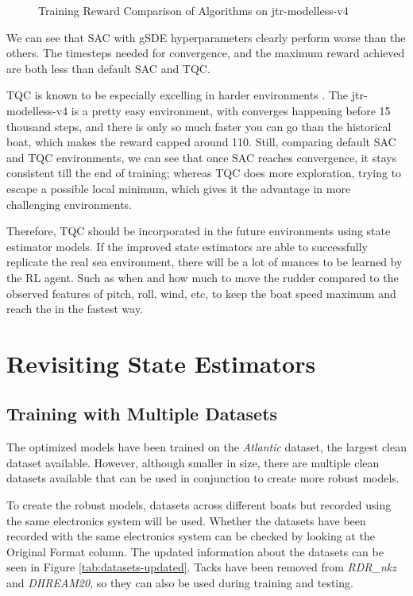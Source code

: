 \documentclass[12pt,twoside]{report}
\begin{document}
\begin{figure}[h]
\begin{subfigure}[b]{0.48\textwidth}
    \end{subfigure}
    \caption{Training Reward Comparison of Algorithms on jtr-modelless-v4}
    \label{fig:rl-comparison}
\end{figure}

We can see that SAC with gSDE hyperparameters clearly perform worse than the others. The timesteps needed for convergence, and the maximum reward achieved are both less than default SAC and TQC. 

TQC is known to be especially excelling in harder environments \cite{tqc-paper}. The jtr-modelless-v4 is a pretty easy environment, with converges happening before 15 thousand steps, and there is only so much faster you can go than the historical boat, which makes the reward capped around 110. Still, comparing default SAC and TQC environments, we can see that once SAC reaches convergence, it stays consistent till the end of training; whereas TQC does more exploration, trying to escape a possible local minimum, which gives it the advantage in more challenging environments. 

Therefore, TQC should be incorporated in the future environments using state estimator models. If the improved state estimators are able to successfully replicate the real sea environment, there will be a lot of nuances to be learned by the RL agent. Such as when and how much to move the rudder compared to the observed features of pitch, roll, wind, etc, to keep the boat speed maximum and reach the in the fastest way.

\chapter{Revisiting State Estimators}

\section{Training with Multiple Datasets}
The optimized models have been trained on the \textit{Atlantic} dataset, the largest clean dataset available. However, although smaller in size, there are multiple clean datasets available that can be used in conjunction to create more robust models.

To create the robust models, datasets across different boats but recorded using the same electronics system will be used. Whether the datasets have been recorded with the same electronics system can be checked by looking at the Original Format column. The updated information about the datasets can be seen in Figure \ref{tab:datasets-updated}. Tacks have been removed from \textit{RDR\_nkz} and \textit{DHREAM20}, so they can also be used during training and testing.
\end{document}
